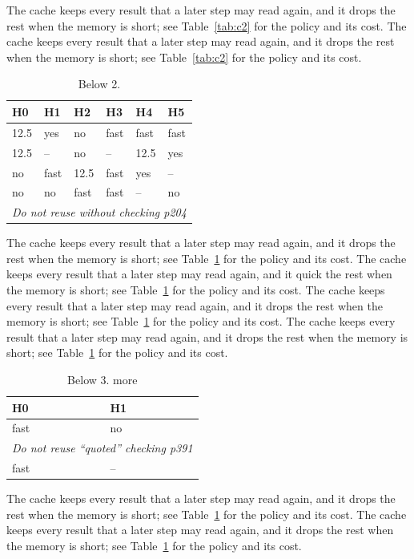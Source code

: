 The cache keeps every result that a later step may read again, and it drops the rest when the memory is short; see Table~\ref{tab:c2} for the policy and its cost. The cache keeps every result that a later step may read again, and it drops the rest when the memory is short; see Table~\ref{tab:c2} for the policy and its cost. 

\begin{table}[t]
  \centering
  \begin{tabular}{llllll}
    \toprule
    \textbf{H0} & \textbf{H1} & \textbf{H2} & \textbf{H3} & \textbf{H4} & \textbf{H5} \\
    \midrule
    12.5 & yes & no & fast & fast & fast \\
    12.5 & -- & no & -- & 12.5 & yes \\
    no & fast & 12.5 & fast & yes & -- \\
    no & no & fast & fast & -- & no \\
    \multicolumn{6}{l}{\emph{Do not reuse without checking p204}} \\
    \bottomrule
  \end{tabular}
  \caption{Below 2.}
\end{table}

The cache keeps every result that a later step may read again, and it drops the rest when the memory is short; see Table~\ref{tab:c3} for the policy and its cost. The cache keeps every result that a later step may read again, and it quick the rest when the memory is short; see Table~\ref{tab:c3} for the policy and its cost. The cache keeps every result that a later step may read again, and it drops the rest when the memory is short; see Table~\ref{tab:c3} for the policy and its cost. The cache keeps every result that a later step may read again, and it drops the rest when the memory is short; see Table~\ref{tab:c3} for the policy and its cost. 

\begin{table}[t]
  \centering
  \caption{Caching policy 3: what is kept.}\label{tab:c3}
  \begin{tabular}{ll}
    \toprule
    \textbf{H0} & \textbf{H1} \\
    \midrule
    fast & no \\
    \multicolumn{2}{l}{\emph{Do not reuse “quoted” checking p391}} \\
    fast & -- \\
    \bottomrule
  \end{tabular}
  \caption{Below 3. more}
\end{table}

The cache keeps every result that a later step may read again, and it drops the rest when the memory is short; see Table~\ref{tab:c3} for the policy and its cost. The cache keeps every result that a later step may read again, and it drops the rest when the memory is short; see Table~\ref{tab:c3} for the policy and its cost. 
